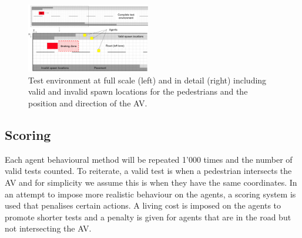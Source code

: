 \documentclass[letterpaper, 10 pt, journal, twoside]{IEEEtran}
\begin{document}



\begin{figure}[!t]
	\centering
\includegraphics[width=0.48\textwidth]{RoadLayout.pdf}
	\caption{Test environment at full scale (left) and in detail (right) including valid and invalid spawn locations for the pedestrians and the position and direction of the AV.}
	\label{gridRoad}
\end{figure}



\subsection{Scoring}
Each agent behavioural method will be repeated 1'000 times and the number of valid tests counted. To reiterate, a valid test is when a pedestrian intersects the AV and for simplicity we assume this is when they have the same coordinates. %
In an attempt to impose more realistic behaviour on the agents, a scoring system is used that penalises certain actions. A living cost is imposed on the agents to promote shorter tests and a penalty is given for agents that are in the road but not intersecting the AV.
\end{document}
